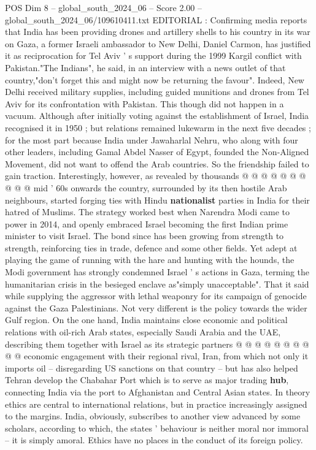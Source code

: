 \begin{textsample}{POS Dim 8 – global\_south\_2024\_06 – Score 2.00 – global\_south\_2024\_06/109610411.txt}  \label{ex:f8_pos_408}
EDITORIAL : Confirming media reports that India has been providing drones and artillery shells to his country in its war on Gaza, a former Israeli ambassador to New Delhi, Daniel Carmon, has justified it as reciprocation for Tel Aviv ' s support during the 1999 Kargil conflict with Pakistan."The Indians", he said, in an interview with a news outlet of that country,"don't forget this and might now be returning the favour".
Indeed, New Delhi received military supplies, including guided munitions and drones from Tel Aviv for its confrontation with Pakistan.
This though did not happen in a vacuum.
Although after initially voting against the establishment of Israel, India recognised it in 1950 ; but relations remained lukewarm in the next five decades ; for the most part because India under Jawaharlal Nehru, who along with four other leaders, including Gamal Abdel Nasser of Egypt, founded the Non-Aligned Movement, did not want to offend the Arab countries.
So the friendship failed to gain traction.
Interestingly, however, as revealed by thousands @ @ @ @ @ @ @ @ @ @ mid ' 60s onwards the country, surrounded by its then hostile Arab neighbours, started forging ties with Hindu \textbf{nationalist} parties in India for their hatred of Muslims.
The strategy worked best when Narendra Modi came to power in 2014, and openly embraced Israel becoming the first Indian prime minister to visit Israel.
The bond since has been growing from strength to strength, reinforcing ties in trade, defence and some other fields.
Yet adept at playing the game of running with the hare and hunting with the hounds, the Modi government has strongly condemned Israel ' s actions in Gaza, terming the humanitarian crisis in the besieged enclave as"simply unacceptable".
That it said while supplying the aggressor with lethal weaponry for its campaign of genocide against the Gaza Palestinians.
Not very different is the policy towards the wider Gulf region.
On the one hand, India maintains close economic and political relations with oil-rich Arab states, especially Saudi Arabia and the UAE, describing them together with Israel as its strategic partners @ @ @ @ @ @ @ @ @ @ economic engagement with their regional rival, Iran, from which not only it imports oil -- disregarding US sanctions on that country -- but has also helped Tehran develop the Chabahar Port which is to serve as major trading \textbf{hub}, connecting India via the port to Afghanistan and Central Asian states.
In theory ethics are central to international relations, but in practice increasingly assigned to the margins.
India, obviously, subscribes to another view advanced by some scholars, according to which, the states ' behaviour is neither moral nor immoral -- it is simply amoral.
Ethics have no places in the conduct of its foreign policy.

\end{textsample}
